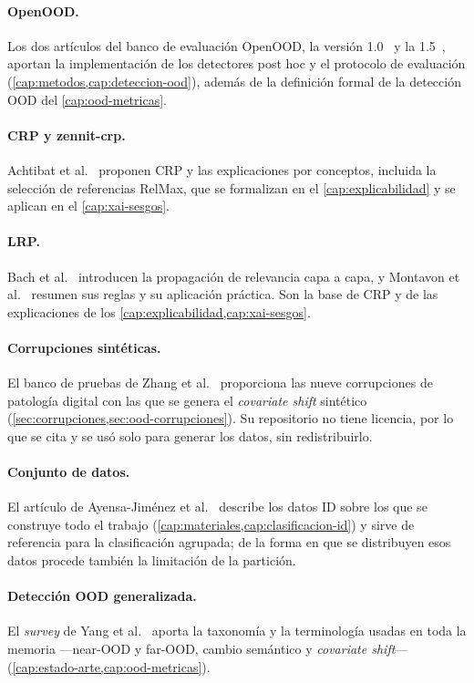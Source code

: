 \paragraph{OpenOOD.} Los dos artículos del banco de evaluación OpenOOD, la versión 1.0~\cite{openood} y la 1.5~\cite{openood15}, aportan la implementación de los detectores post hoc y el protocolo de evaluación (\cref{cap:metodos,cap:deteccion-ood}), además de la definición formal de la detección OOD del \cref{cap:ood-metricas}.

\paragraph{CRP y zennit-crp.} Achtibat et al.~\cite{achtibat2023} proponen CRP y las explicaciones por conceptos, incluida la selección de referencias RelMax, que se formalizan en el \cref{cap:explicabilidad} y se aplican en el \cref{cap:xai-sesgos}.

\paragraph{LRP.} Bach et al.~\cite{bach2015} introducen la propagación de relevancia capa a capa, y Montavon et al.~\cite{montavon2019lrp} resumen sus reglas y su aplicación práctica. Son la base de CRP y de las explicaciones de los \cref{cap:explicabilidad,cap:xai-sesgos}.

\paragraph{Corrupciones sintéticas.} El banco de pruebas de Zhang et al.~\cite{zhang2022corruptions} proporciona las nueve corrupciones de patología digital con las que se genera el \emph{covariate shift} sintético (\cref{sec:corrupciones,sec:ood-corrupciones}). Su repositorio no tiene licencia, por lo que se cita y se usó solo para generar los datos, sin redistribuirlo.

\paragraph{Conjunto de datos.} El artículo de Ayensa-Jiménez et al.~\cite{ayensa2026} describe los datos ID sobre los que se construye todo el trabajo (\cref{cap:materiales,cap:clasificacion-id}) y sirve de referencia para la clasificación agrupada; de la forma en que se distribuyen esos datos procede también la limitación de la partición.

\paragraph{Detección OOD generalizada.} El \emph{survey} de Yang et al.~\cite{yang2024} aporta la taxonomía y la terminología usadas en toda la memoria ---near-OOD y far-OOD, cambio semántico y \emph{covariate shift}--- (\cref{cap:estado-arte,cap:ood-metricas}).

